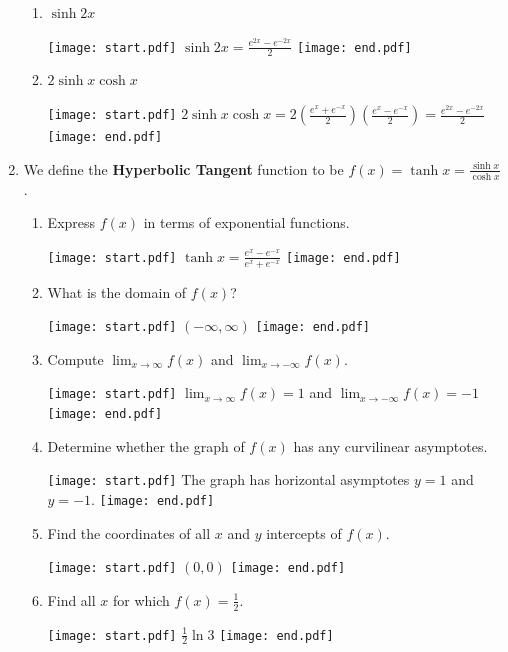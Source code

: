 \documentclass[12pt]{article}
\begin{document}
\begin{enumerate}
\begin{enumerate}

\item $\sinh{2x}$

\texttt{[image: start.pdf]}
{$\sinh{2x}=\frac{e^{2x}-e^{-2x}}{2}$}
\texttt{[image: end.pdf]}


\item $2\sinh{x}\cosh{x}$

\texttt{[image: start.pdf]}
{$2\sinh{x}\cosh{x}=2\left(\frac{e^x+e^{-x}}{2}\right)\left(\frac{e^x-e^{-x}}{2}\right)=\frac{e^{2x}-e^{-2x}}{2}$}
\texttt{[image: end.pdf]}


\end{enumerate}

\item We define the {\bf Hyperbolic Tangent} function to be $f(x)=\tanh{x}=\frac{\sinh{x}}{\cosh{x}}$.

\begin{enumerate}

\item Express $f(x)$ in terms of exponential functions.

\texttt{[image: start.pdf]}
{$\tanh{x}=\frac{e^x-e^{-x}}{e^x+e^{-x}}$}
\texttt{[image: end.pdf]}


\item What is the domain of $f(x)$?

\texttt{[image: start.pdf]}
{$(-\infty,\infty)$}
\texttt{[image: end.pdf]}


\item Compute $\lim_{x\to\infty}f(x)$ and $\lim_{x\to-\infty}f(x)$.

\texttt{[image: start.pdf]}
{$\lim_{x\to\infty}f(x)=1$ and $\lim_{x\to-\infty}f(x)=-1$}
\texttt{[image: end.pdf]}


\item Determine whether the graph of $f(x)$ has any curvilinear asymptotes.

\texttt{[image: start.pdf]}
{The graph has horizontal asymptotes $y=1$ and $y=-1$.}
\texttt{[image: end.pdf]}


\item Find the coordinates of all $x$ and $y$ intercepts of $f(x)$.

\texttt{[image: start.pdf]}
{{$(0,0)$}}
\texttt{[image: end.pdf]}


\item Find all $x$ for which $f(x)=\frac{1}{2}$.

\texttt{[image: start.pdf]}
{$\frac{1}{2}\ln{3}$}
\texttt{[image: end.pdf]}



\end{enumerate}
\end{enumerate}
\end{document}
